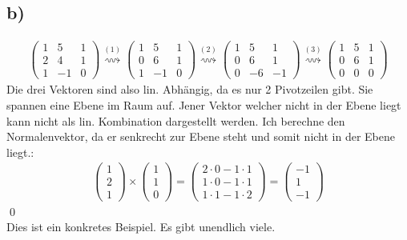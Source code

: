 \documentclass[titlepage]{article}
\begin{document}
		\subsection*{b)}
			\begin{align*}
				\begin{pmatrix}
					1&5&1\\
					2&4&1\\
					1&-1&0
				\end{pmatrix}
				\overset{(1)}{\rightsquigarrow}
				\begin{pmatrix}
					1&5&1\\
					0&6&1\\
					1&-1&0
				\end{pmatrix}
				\overset{(2)}{\rightsquigarrow}
				\begin{pmatrix}
					1&5&1\\
					0&6&1\\
					0&-6&-1
				\end{pmatrix}
				\overset{(3)}{\rightsquigarrow}
				\begin{pmatrix}
					1&5&1\\
					0&6&1\\
					0&0&0
				\end{pmatrix}
			\end{align*}
		Die drei Vektoren sind also lin. Abhängig, da es nur 2 Pivotzeilen gibt. Sie spannen eine Ebene im Raum auf. Jener Vektor welcher nicht in der Ebene liegt kann nicht als lin. Kombination dargestellt werden. Ich berechne den Normalenvektor, da er senkrecht zur Ebene steht und somit nicht in der Ebene liegt.:
		\begin{align*}
			\begin{pmatrix}
				1\\2\\1
			\end{pmatrix}\times
			\begin{pmatrix}
				1\\1\\0
			\end{pmatrix}=
			\begin{pmatrix}
				2\cdot0-1\cdot1\\1\cdot0-1\cdot1\\1\cdot1-1\cdot2
			\end{pmatrix}=
			\begin{pmatrix}
				-1\\1\\-1
			\end{pmatrix}
		\end{align*}\qed\\
		Dies ist ein konkretes Beispiel. Es gibt unendlich viele.
\end{document}
